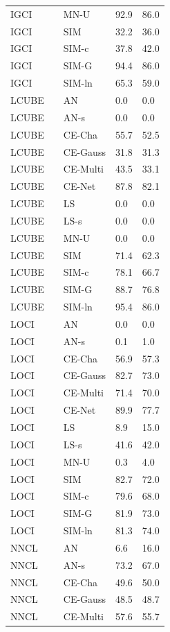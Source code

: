 \begin{tabular}{lllll}
IGCI &  & MN-U & 92.9 & 86.0 \\
IGCI &  & SIM & 32.2 & 36.0 \\
IGCI &  & SIM-c & 37.8 & 42.0 \\
IGCI &  & SIM-G & 94.4 & 86.0 \\
IGCI &  & SIM-ln & 65.3 & 59.0 \\
LCUBE &  & AN & 0.0 & 0.0 \\
LCUBE &  & AN-s & 0.0 & 0.0 \\
LCUBE &  & CE-Cha & 55.7 & 52.5 \\
LCUBE &  & CE-Gauss & 31.8 & 31.3 \\
LCUBE &  & CE-Multi & 43.5 & 33.1 \\
LCUBE &  & CE-Net & 87.8 & 82.1 \\
LCUBE &  & LS & 0.0 & 0.0 \\
LCUBE &  & LS-s & 0.0 & 0.0 \\
LCUBE &  & MN-U & 0.0 & 0.0 \\
LCUBE &  & SIM & 71.4 & 62.3 \\
LCUBE &  & SIM-c & 78.1 & 66.7 \\
LCUBE &  & SIM-G & 88.7 & 76.8 \\
LCUBE &  & SIM-ln & 95.4 & 86.0 \\
LOCI &  & AN & 0.0 & 0.0 \\
LOCI &  & AN-s & 0.1 & 1.0 \\
LOCI &  & CE-Cha & 56.9 & 57.3 \\
LOCI &  & CE-Gauss & 82.7 & 73.0 \\
LOCI &  & CE-Multi & 71.4 & 70.0 \\
LOCI &  & CE-Net & 89.9 & 77.7 \\
LOCI &  & LS & 8.9 & 15.0 \\
LOCI &  & LS-s & 41.6 & 42.0 \\
LOCI &  & MN-U & 0.3 & 4.0 \\
LOCI &  & SIM & 82.7 & 72.0 \\
LOCI &  & SIM-c & 79.6 & 68.0 \\
LOCI &  & SIM-G & 81.9 & 73.0 \\
LOCI &  & SIM-ln & 81.3 & 74.0 \\
NNCL &  & AN & 6.6 & 16.0 \\
NNCL &  & AN-s & 73.2 & 67.0 \\
NNCL &  & CE-Cha & 49.6 & 50.0 \\
NNCL &  & CE-Gauss & 48.5 & 48.7 \\
NNCL &  & CE-Multi & 57.6 & 55.7 \\

\end{tabular}

